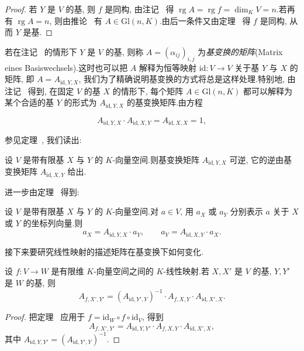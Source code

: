 \begin{proof}
若 $Y$ 是 $V$ 的基, 则 $f$ 是同构, 由注记~ 得 $\operatorname{rg} A = \operatorname{rg} f = \dim_K V = n$.若再有 $\operatorname{rg} A = n$, 则由推论~ 有 $A \in \mathrm{Gl}(n, K)$.由后一条件又由定理~ 得 $f$ 是同构, 从而 $Y$ 是基.
\end{proof}

若在注记~ 的情形下 $Y$ 是 $V$ 的基, 则称 $A = (\alpha_{ij})_{i, j}$ 为\emph{基变换的矩阵}(\textup{Matrix eines Basiswechsels}).这时也可以把 $A$ 解释为恒等映射 $\mathrm{id} \colon V \longrightarrow V$ 关于基 $Y$ 与 $X$ 的矩阵, 即 $A = A_{\mathrm{id}, Y, X}$, 我们为了精确说明基变换的方式将总是这样处理.特别地, 由注记~ 得到, 在固定 $V$ 的基 $X$ 的情形下, 每个矩阵 $A \in \mathrm{Gl}(n, K)$ 都可以解释为某个合适的基 $Y$ 的形式为 $A_{\mathrm{id}, Y, X}$ 的基变换矩阵.由方程

\[
A_{\mathrm{id}, Y, X} \cdot A_{\mathrm{id}, X, Y} = A_{\mathrm{id}, X, X} = 1,
\]

参见定理~, 我们读出:

\begin{remark}\label{rem:3.4.2}
设 $V$ 是带有限基 $X$ 与 $Y$ 的 $K$-向量空间.则基变换矩阵 $A_{\mathrm{id}, Y, X}$ 可逆, 它的逆由基变换矩阵 $A_{\mathrm{id}, X, Y}$ 给出.
\end{remark}

进一步由定理~ 得到:

\begin{remark}\label{rem:3.4.3}
设 $V$ 是带有限基 $X$ 与 $Y$ 的 $K$-向量空间.对 $a \in V$, 用 $a_X$ 或 $a_Y$ 分别表示 $a$ 关于 $X$ 或 $Y$ 的坐标列向量.则
\[
a_X = A_{\mathrm{id}, Y, X} \cdot a_Y, \qquad a_Y = A_{\mathrm{id}, X, Y} \cdot a_X\text{.}
\]
\end{remark}

接下来要研究线性映射的描述矩阵在基变换下如何变化.

\begin{theorem}\label{thm:3.4.4}
设 $f \colon V \longrightarrow W$ 是有限维 $K$-向量空间之间的 $K$-线性映射.若 $X, X'$ 是 $V$ 的基, $Y, Y'$ 是 $W$ 的基, 则
\[
A_{f, X', Y'} = (A_{\mathrm{id}, Y', Y})^{-1} \cdot A_{f, X, Y} \cdot A_{\mathrm{id}, X', X}\text{.}
\]
\end{theorem}

\begin{proof}
把定理~ 应用于 $f = \mathrm{id}_W \circ f \circ \mathrm{id}_V$, 得到
\[
A_{f, X', Y'} = A_{\mathrm{id}, Y, Y'} \cdot A_{f, X, Y} \cdot A_{\mathrm{id}, X', X},
\]
其中 $A_{\mathrm{id}, Y, Y'} = (A_{\mathrm{id}, Y', Y})^{-1}$.
\end{proof}

